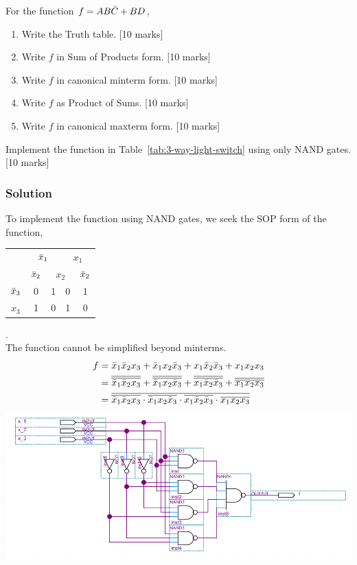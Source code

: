 \begin{prob}
  For the function $f = AB\bar{C} + BD$,
  \begin{enumerate}
    \item Write the Truth table. [10 marks]
    \item Write $f$ in Sum of Products form. [10 marks]
    \item Write $f$ in canonical minterm form. [10 marks]
    \item Write $f$ as Product of Sums. [10 marks]
    \item Write $f$ in canonical maxterm form. [10 marks]
  \end{enumerate}
\end{prob}

\begin{prob}
 Implement the function in Table~\ref{tab:3-way-light-switch} using only NAND
 gates. [10 marks]
\end{prob}
\subsubsection*{Solution}
To implement the function using NAND gates, we seek the SOP form of the
function,
\\
\begin{tabular}{c|c|c|c|c}
  \toprule
  & \multicolumn{2}{c|}{$\bar{x}_1$} & \multicolumn{2}{c}{$x_1$}
  \\
  & $\bar{x}_2$ & \multicolumn{2}{c|}{$x_2$} & $\bar{x}_2$
  \\ \midrule
  $\bar{x}_3$
  & 0 & 1 & 0 & 1
  \\
  $x_3$
  & 1 & 0 & 1 & 0
  \\\bottomrule
\end{tabular}.
\\
The function cannot be simplified beyond minterms.
\begin{align*}
  f &= \bar{x}_1 \bar{x}_2 x_3 + \bar{x}_1 x_2 \bar{x}_3 + x_1 \bar{x}_2 \bar{x}_3 + x_1 x_2 x_3
  \\
    &= \overline{\overline{\bar{x}_1 \bar{x}_2 x_3}} + \overline{\overline{\bar{x}_1 x_2 \bar{x}_3}} + \overline{\overline{x_1 \bar{x}_2 \bar{x}_3}} + \overline{\overline{x_1 x_2 x_3}}
  \\
    &= \overline{\overline{\bar{x}_1 \bar{x}_2 x_3} \cdot {\overline{\bar{x}_1 x_2 \bar{x}_3}} \cdot {\overline{x_1 \bar{x}_2 \bar{x}_3}} \cdot {\overline{x_1 x_2 x_3}}}
\end{align*}
\includegraphics[width=\linewidth]{files/hw2p3.png}

